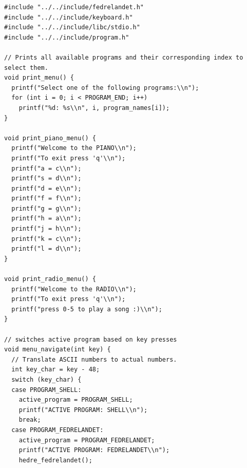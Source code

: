 \documentclass[../main.tex]{subfiles}
\begin{document}
\begin{listing}[H]
    \begin{verbatim}
#include "../../include/fedrelandet.h"
#include "../../include/keyboard.h"
#include "../../include/libc/stdio.h"
#include "../../include/program.h"

// Prints all available programs and their corresponding index to select them.
void print_menu() {
  printf("Select one of the following programs:\\n");
  for (int i = 0; i < PROGRAM_END; i++)
    printf("%d: %s\\n", i, program_names[i]);
}

void print_piano_menu() {
  printf("Welcome to the PIANO\\n");
  printf("To exit press 'q'\\n");
  printf("a = c\\n");
  printf("s = d\\n");
  printf("d = e\\n");
  printf("f = f\\n");
  printf("g = g\\n");
  printf("h = a\\n");
  printf("j = h\\n");
  printf("k = c\\n");
  printf("l = d\\n");
}

void print_radio_menu() {
  printf("Welcome to the RADIO\\n");
  printf("To exit press 'q'\\n");
  printf("press 0-5 to play a song :)\\n");
}

// switches active program based on key presses
void menu_navigate(int key) {
  // Translate ASCII numbers to actual numbers.
  int key_char = key - 48;
  switch (key_char) {
  case PROGRAM_SHELL:
    active_program = PROGRAM_SHELL;
    printf("ACTIVE PROGRAM: SHELL\\n");
    break;
  case PROGRAM_FEDRELANDET:
    active_program = PROGRAM_FEDRELANDET;
    printf("ACTIVE PROGRAM: FEDRELANDET\\n");
    hedre_fedrelandet();


\end{verbatim}
\end{listing}
\end{document}
